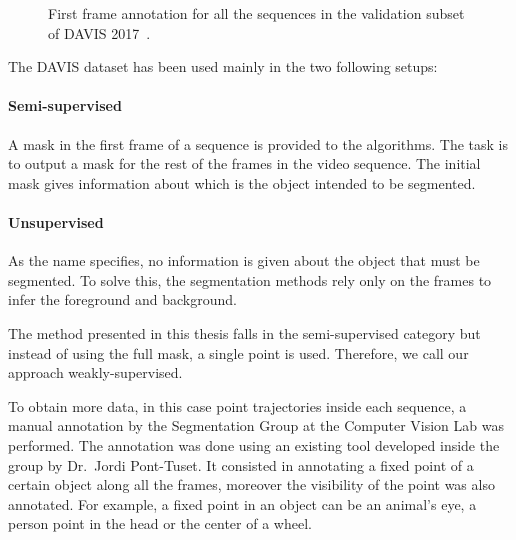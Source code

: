 \begin{figure}[h]
  \centering
  \caption{First frame annotation for all the sequences in the validation subset of DAVIS 2017~\davislast.}
  \label{fig:davis}
\end{figure}


The DAVIS dataset has been used mainly in the two following setups:

\paragraph{Semi-supervised}

A mask in the first frame of a sequence is provided to the algorithms. 
The task is to output a mask for the rest of the frames in the video sequence. 
The initial mask gives information about which is the object intended to be segmented.

\paragraph{Unsupervised}

As the name specifies, no information is given about the object that must be segmented.
To solve this, the segmentation methods rely only on the frames to infer the foreground and background.

The method presented in this thesis falls in the semi-supervised category but instead of using the full mask, a single point is used. Therefore, we call our approach weakly-supervised.

To obtain more data, in this case point trajectories inside each sequence, a manual annotation by the Segmentation Group at the Computer Vision Lab was performed.
The annotation was done using an existing tool developed inside the group by Dr.~Jordi Pont-Tuset.
It consisted in annotating a fixed point of a certain object along all the frames, moreover the visibility of the point was also annotated.
For example, a fixed point in an object can be an animal's eye, a person point in the head or the center of a wheel.

